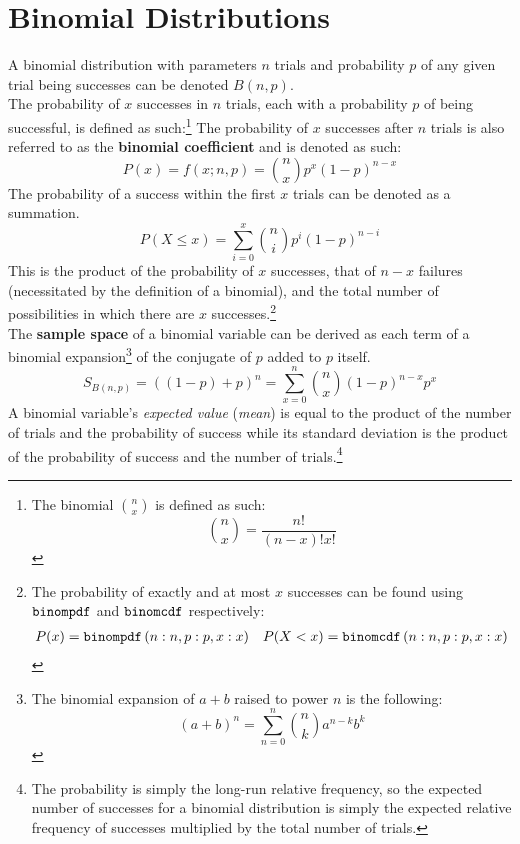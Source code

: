 \documentclass[../AP_Statistics.tex]{subfiles}
\begin{document}
		\section{Binomial Distributions}
			A binomial distribution with parameters $n$ trials and probability $p$ of any given trial being successes can be denoted $B(n, p)$. \\
			The probability of $x$ successes in $n$ trials, each with a probability $p$ of being successful, is defined as such:\footnote{The binomial $\binom{n}{x}$ is defined as such:\[\binom{n}{x} = \frac{n!}{(n - x)!x!}\]}
			The probability of $x$ successes after $n$ trials is also referred to as the \textbf{binomial coefficient} and is denoted as such:
			\[P(x) = f(x;n,p) = \binom{n}{x}p^x(1 - p)^{n - x}\]
			The probability of a success within the first $x$ trials can be denoted as a summation.
			\[P(X \le x) = \sum_{i = 0}^x\binom{n}{i}p^i(1 - p)^{n - i}\]
			This is the product of the probability of $x$ successes, that of $n - x$ failures (necessitated by the definition of a binomial), and the total number of possibilities in which there are $x$ successes.\footnote{The probability of exactly and at most $x$ successes can be found using $\operatorname{\texttt{binompdf}}$ and $\operatorname{\texttt{binomcdf}}$ respectively:\begin{align*}P(x) = \operatorname{\texttt{binompdf}}\left(n:n, p:p, x:x\right) && P(X < x) = \operatorname{\texttt{binomcdf}}\left(n:n, p:p, x:x\right)\end{align*}} \\
			The \textbf{sample space} of a binomial variable can be derived as each term of a binomial expansion\footnote{The binomial expansion of $a + b$ raised to power $n$ is the following:\[(a + b)^n = \sum_{n = 0}^n\binom{n}{k}a^{n - k}b^k\]} of the conjugate of $p$ added to $p$ itself.
			\[S_{B(n, p)} = ((1 - p) + p)^n = \sum_{x = 0}^n\binom{n}{x}(1 - p)^{n - x}p^x\]
			A binomial variable's \emph{expected value} (\emph{mean}) is equal to the product of the number of trials and the probability of success while its standard deviation is the product of the probability of success and the number of trials.\footnote{The probability is simply the long-run relative frequency, so the expected number of successes for a binomial distribution is simply the expected relative frequency of successes multiplied by the total number of trials.}
\end{document}
